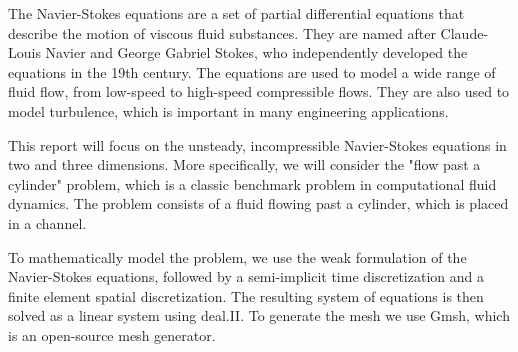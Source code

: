 The Navier-Stokes equations are a set of partial differential equations that describe the motion of viscous fluid substances. They are named after Claude-Louis Navier and George Gabriel Stokes, who independently developed the equations in the 19th century. The equations are used to model a wide range of fluid flow, from low-speed to high-speed compressible flows. They are also used to model turbulence, which is important in many engineering applications.

This report will focus on the unsteady, incompressible Navier-Stokes equations in two and three dimensions. More specifically, we will consider the "flow past a cylinder" problem, which is a classic benchmark problem in computational fluid dynamics. The problem consists of a fluid flowing past a cylinder, which is placed in a channel.

To mathematically model the problem, we use the weak formulation of the Navier-Stokes equations, followed by a semi-implicit time discretization and a finite element spatial discretization. The resulting system of equations is then solved as a linear system using deal.II. To generate the mesh we use Gmsh, which is an open-source mesh generator.